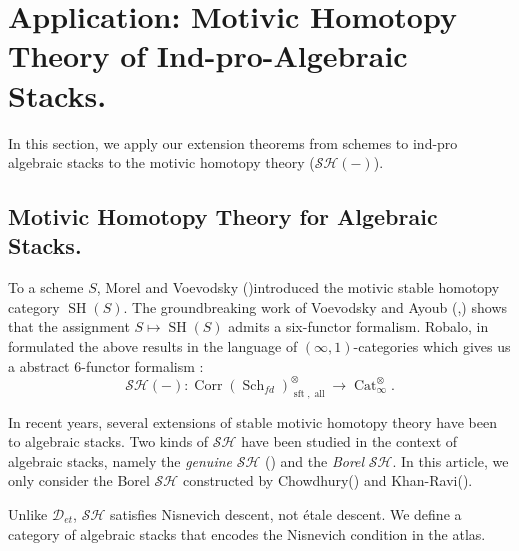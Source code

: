 \documentclass[14pt]{article}
\theoremstyle{definition}
\newcommand{\D}{\mathcal{D}}
\newcommand{\op}[1]{\operatorname{#1}}
\newcommand{\Schf}{\op{Sch}_{fd}}
\numberwithin{subsection}{section}
\newcommand{\SH}{\mathcal{SH}}
\begin{document}
\section{Application: Motivic Homotopy Theory  of Ind-pro-Algebraic Stacks.}

In this section, we apply our extension theorems from schemes to  ind-pro algebraic stacks to the motivic homotopy theory ($\SH (-)$). 
\subsection{Motivic Homotopy Theory for Algebraic Stacks.}
To a scheme $S$, Morel and Voevodsky (\cite{Morel-Voevodsky})introduced the motivic stable homotopy category $\op{SH}(S)$. The groundbreaking work of Voevodsky and Ayoub (\cite{Ayoub_6FF_vol1},\cite{Ayoub_6FF_vol2}) shows that the assignment $ S \mapsto \op{SH}(S)$ admits a six-functor formalism. Robalo, in \cite{Robalothesis} formulated the above results in the language of $(\infty,1)$-categories which gives us a abstract 6-functor formalism :
\begin{equation}
    \SH (-) : \op{Corr}(\Schf)^{\otimes}_{\op{sft},\op{all}} \to \op{Cat}^{\otimes}_{\infty}.
\end{equation}

In recent years, several extensions of stable motivic homotopy theory have been to algebraic stacks. Two kinds of $\SH$ have been studied in the context of algebraic stacks, namely the \textit{genuine} $\SH$ (\cite{Hoyois_Equiv_Six_Op}) and the \textit{Borel} $\SH$. In this article, we only consider the Borel $\SH$ constructed by Chowdhury(\cite{Chowdhury}) and Khan-Ravi(\cite{Khan-Ravi_Generalised_Coh_Stacks}). 

Unlike $ \D_{et}$, $ \SH$ satisfies Nisnevich descent, not étale descent. We define a category of algebraic stacks that encodes the Nisnevich condition in the atlas.
\end{document}

